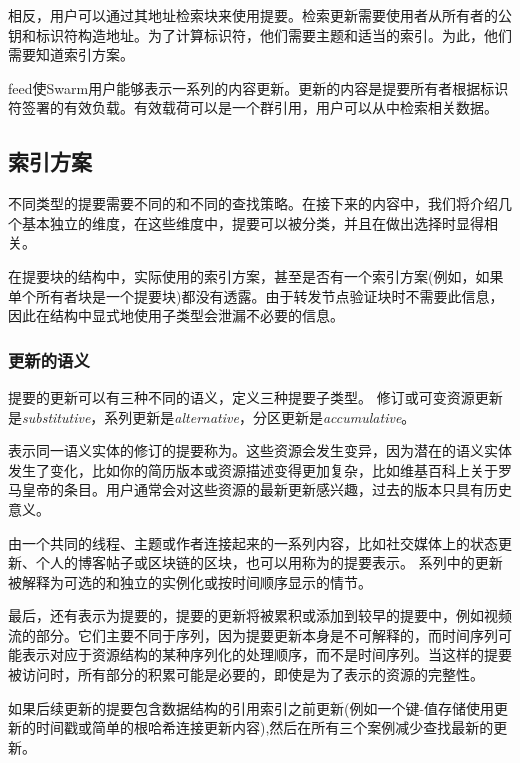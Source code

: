 相反，用户可以通过其地址检索块来使用提要。检索更新需要使用者从所有者的公钥和标识符构造地址。为了计算标识符，他们需要主题和适当的索引。为此，他们需要知道索引方案。

feed使Swarm用户能够表示一系列的内容更新。更新的内容是提要所有者根据标识符签署的有效负载。有效载荷可以是一个群引用，用户可以从中检索相关数据。

\subsection{索引方案\statusyellow}\label{sec:indexing-schemes}

不同类型的提要需要不同的和不同的查找策略。在接下来的内容中，我们将介绍几个基本独立的维度，在这些维度中，提要可以被分类，并且在做出选择时显得相关。


在提要块的结构中，实际使用的索引方案，甚至是否有一个索引方案(例如，如果单个所有者块是一个提要块)都没有透露。由于转发节点验证块时不需要此信息，因此在结构中显式地使用子类型会泄漏不必要的信息。 

\subsubsection{更新的语义}

提要的更新可以有三种不同的语义，定义三种提要子类型。
修订或可变资源更新是\emph{substitutive}，系列更新是\emph{alternative}，分区更新是\emph{accumulative}。 

表示同一语义实体的修订的提要称为。这些资源会发生变异，因为潜在的语义实体发生了变化，比如你的简历版本或资源描述变得更加复杂，比如维基百科上关于罗马皇帝的条目。用户通常会对这些资源的最新更新感兴趣，过去的版本只具有历史意义。

由一个共同的线程、主题或作者连接起来的一系列内容，比如社交媒体上的状态更新、个人的博客帖子或区块链的区块，也可以用称为的提要表示。
系列中的更新被解释为可选的和独立的实例化或按时间顺序显示的情节。

最后，还有表示为提要的，提要的更新将被累积或添加到较早的提要中，例如视频流的部分。它们主要不同于序列，因为提要更新本身是不可解释的，而时间序列可能表示对应于资源结构的某种序列化的处理顺序，而不是时间序列。当这样的提要被访问时，所有部分的积累可能是必要的，即使是为了表示的资源的完整性。

如果后续更新的提要包含数据结构的引用索引之前更新(例如一个键-值存储使用更新的时间戳或简单的根哈希连接更新内容),然后在所有三个案例减少查找最新的更新。

